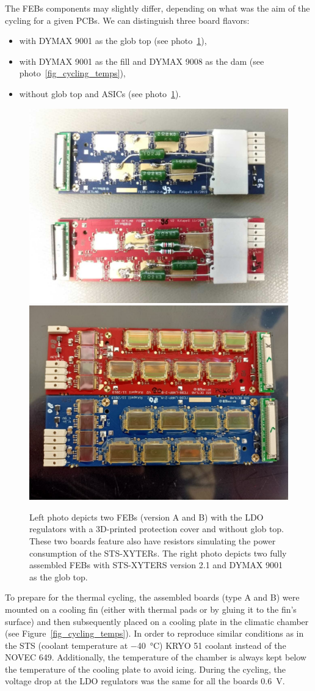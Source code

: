 The \gls{FEB}s components may slightly differ, depending on what was the aim of the cycling for a given \glspl{PCB}. We can distinguish three board flavors:
\begin{itemize}
    \item with DYMAX 9001 as the glob top (see photo~\ref{fig_noglobtop}),
    \item with DYMAX 9001 as the fill and DYMAX 9008 as the dam (see photo~\ref{fig_cycling_temps}), 
    \item without glob top and \glspl{ASIC} (see photo~\ref{fig_noglobtop}).
    \end{itemize}
\newpage
\begin{figure}[!h]
\centering
\includegraphics[width=0.45\columnwidth]{Chapter4/images/noglobtop.jpg}
\includegraphics[width=0.45\columnwidth]{Chapter4/images/globtop.jpg}
\caption{Left photo depicts two \glspl{FEB} (version A and B) with the \gls{LDO} regulators with a 3D-printed protection cover and without glob top. These two boards feature also have resistors simulating the power consumption of the STS-XYTERs.
The right photo depicts two fully assembled \gls{FEB}s with STS-XYTERS version 2.1 and DYMAX 9001 as the glob top.}
\label{fig_noglobtop}
\end{figure}

To prepare for the thermal cycling, the assembled boards (type A and B) were mounted on a cooling fin (either with thermal pads or by gluing it to the fin's surface) and then subsequently placed on a cooling plate in the climatic chamber (see Figure~\ref{fig_cycling_temps}). In order to reproduce similar conditions as in the \gls{STS} (coolant temperature at \SI{-40}{\celsius}) KRYO 51 coolant instead of the NOVEC 649. Additionally, the temperature of the chamber is always kept below the temperature of the cooling plate to avoid icing. During the cycling, the voltage drop at the \gls{LDO} regulators was the same for all the boards \SI{0.6}{\volt}.

